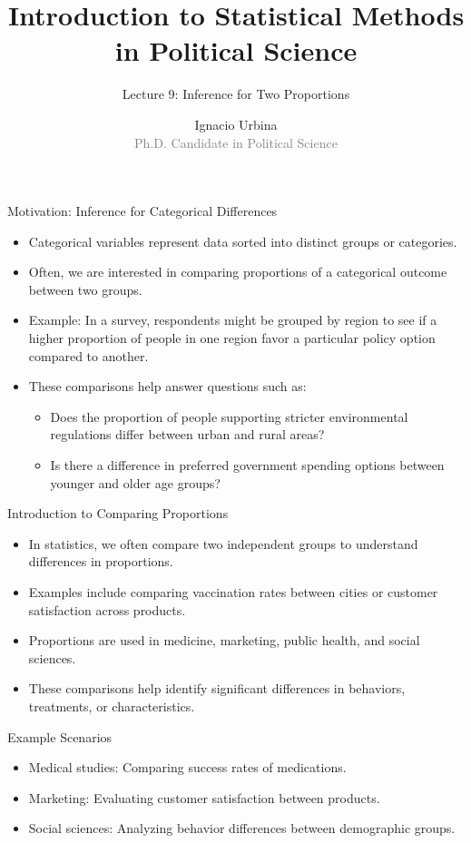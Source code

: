 \documentclass[handout]{beamer} %
\title{Introduction to Statistical Methods in Political Science}
\subtitle{Lecture 9: Inference for Two Proportions}
\author{Ignacio Urbina \texorpdfstring{\\ \vspace{0.3em}}{ } \scriptsize \textcolor{gray}{Ph.D. Candidate in Political Science}}
\date{}
\begin{document}
\begin{frame}
  \titlepage
\end{frame}

\begin{frame}{Motivation: Inference for Categorical Differences}
  \begin{itemize}
    \item Categorical variables represent data sorted into distinct groups or categories.
    \item Often, we are interested in comparing proportions of a categorical outcome between two groups.
    \item Example: In a survey, respondents might be grouped by region to see if a higher proportion of people in one region favor a particular policy option compared to another.
    \item These comparisons help answer questions such as:
      \begin{itemize}
        \item Does the proportion of people supporting stricter environmental regulations differ between urban and rural areas?
        \item Is there a difference in preferred government spending options between younger and older age groups?
      \end{itemize}
  \end{itemize}
\end{frame}

\begin{frame}{Introduction to Comparing Proportions}
  \begin{itemize}
    \item In statistics, we often compare two independent groups to understand differences in proportions.
    \item Examples include comparing vaccination rates between cities or customer satisfaction across products.
    \item Proportions are used in medicine, marketing, public health, and social sciences.
    \item These comparisons help identify significant differences in behaviors, treatments, or characteristics.
  \end{itemize}
\end{frame}

\begin{frame}{Example Scenarios}
  \begin{itemize}
    \item Medical studies: Comparing success rates of medications.
    \item Marketing: Evaluating customer satisfaction between products.
    \item Social sciences: Analyzing behavior differences between demographic groups.
  \end{itemize}
\end{frame}
\end{document}
